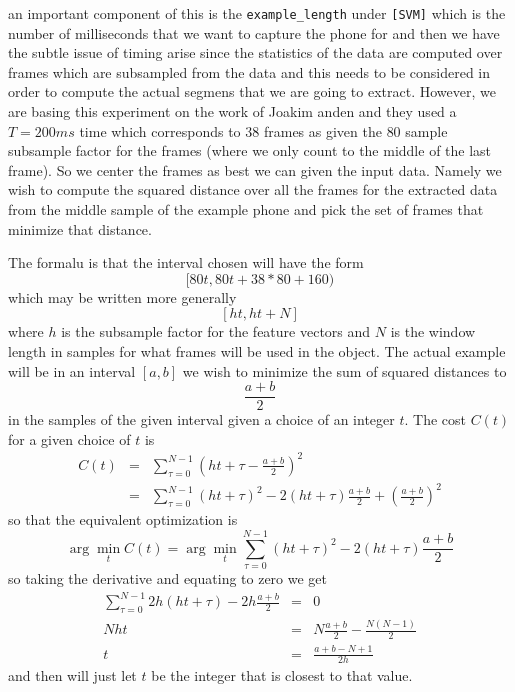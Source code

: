 \documentclass{article}
\begin{document}
an important component of this is the
\texttt{example\_length} under \texttt{[SVM]} which is the number
of milliseconds that we want to capture the phone for
and then we have the subtle issue of timing arise since the statistics of the data are computed over frames which are subsampled
from the data and this needs to be considered in order to compute
the actual segmens that we are going to extract.  However, we are
basing this experiment on the work of Joakim anden and they used
a $T=200ms$ time which corresponds to $38$ frames as given
the $80$ sample subsample factor for the frames (where we only count to the middle of the last frame).  So we center
the frames as best we can given the input data.  Namely we wish to compute the squared distance over all the frames for the extracted data from the middle sample of the example phone and pick the set
of frames that minimize that distance.

The formalu is that the interval chosen will have the form
$$ [80t, 80t+38*80+160)  $$
which may be written more generally
$$ [ht,ht+N] $$
where $h$ is the subsample factor for the feature vectors and
$N$ is the window length in samples for what frames will be used in
the object.  
The actual example will be in an interval $[a,b]$
we wish to minimize the sum of squared distances to 
$$ \frac{a+b}{2}$$
in the samples of the given interval
given a choice of an integer $t$.  The cost $C(t)$ for a given choice
of $t$ is
\begin{equation}\begin{array}{rcl}
C(t) &=& \sum_{\tau=0}^{N-1} \left(ht+\tau-\frac{a+b}{2}\right)^2\\
&=& \sum_{\tau=0}^{N-1} (ht+\tau)^2-2(ht+\tau)\frac{a+b}{2} +\left(\frac{a+b}{2}\right)^2 
\end{array}\end{equation}
so that the equivalent optimization is
\begin{equation}
\arg\min_t C(t) = \arg\min_t \sum_{\tau=0}^{N-1} (ht+\tau)^2-2(ht+\tau)\frac{a+b}{2}
\end{equation}
so taking the derivative and equating to zero we get
\begin{equation}\begin{array}{rcl}
\sum_{\tau=0}^{N-1} 2h(ht+\tau)- 2h\frac{a+b}{2} &=& 0\\
Nht &=& N\frac{a+b}{2}-\frac{N(N-1)}{2}\\
t &=& \frac{a+b-N+1}{2h}
\end{array}
\end{equation}
and then will just let $t$ be the integer that is closest to that
value.
\end{document}
